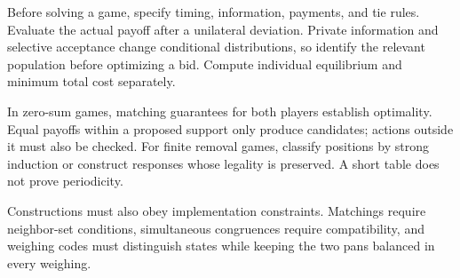 Before solving a game, specify timing, information, payments, and tie rules. Evaluate the actual payoff after a unilateral deviation. Private information and selective acceptance change conditional distributions, so identify the relevant population before optimizing a bid. Compute individual equilibrium and minimum total cost separately.

In zero-sum games, matching guarantees for both players establish optimality. Equal payoffs within a proposed support only produce candidates; actions outside it must also be checked. For finite removal games, classify positions by strong induction or construct responses whose legality is preserved. A short table does not prove periodicity.

Constructions must also obey implementation constraints. Matchings require neighbor-set conditions, simultaneous congruences require compatibility, and weighing codes must distinguish states while keeping the two pans balanced in every weighing.
\par\smallskip
